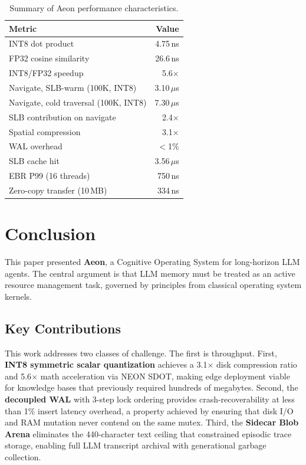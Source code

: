 \documentclass[10pt,twocolumn]{article}
\begin{document}
\begin{table}[!htbp]
\centering
\caption{Summary of Aeon performance characteristics.}
\label{tab:summary}
\begin{tabular}{lr}
\toprule
\textbf{Metric} & \textbf{Value} \\
\midrule
INT8 dot product & 4.75\,ns \\
FP32 cosine similarity & 26.6\,ns \\
INT8/FP32 speedup & 5.6$\times$ \\
Navigate, SLB-warm (100K, INT8) & 3.10\,$\mu$s \\
Navigate, cold traversal (100K, INT8) & 7.30\,$\mu$s \\
SLB contribution on navigate & 2.4$\times$ \\
Spatial compression & 3.1$\times$ \\
WAL overhead & $<$1\% \\
SLB cache hit & 3.56\,$\mu$s \\
EBR P99 (16 threads) & 750\,ns \\
Zero-copy transfer (10\,MB) & 334\,ns \\
\bottomrule
\end{tabular}
\end{table}



\section{Conclusion}

This paper presented \textbf{Aeon}, a Cognitive Operating System for long-horizon LLM agents. The central argument is that LLM memory must be treated as an active resource management task, governed by principles from classical operating system kernels.

\subsection{Key Contributions}

This work addresses two classes of challenge. The first is throughput. First, \textbf{INT8 symmetric scalar quantization} achieves a 3.1$\times$ disk compression ratio and 5.6$\times$ math acceleration via NEON SDOT, making edge deployment viable for knowledge bases that previously required hundreds of megabytes. Second, the \textbf{decoupled WAL} with 3-step lock ordering provides crash-recoverability at less than 1\% insert latency overhead, a property achieved by ensuring that disk I/O and RAM mutation never contend on the same mutex. Third, the \textbf{Sidecar Blob Arena} eliminates the 440-character text ceiling that constrained episodic trace storage, enabling full LLM transcript archival with generational garbage collection.
\end{document}

